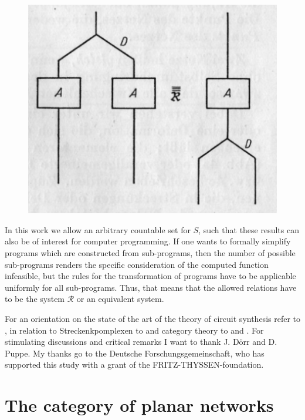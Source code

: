 \documentclass{article}
\begin{document}
\begin{figure}
\includegraphics[]{figure2.png}
  \centering
\caption{}
\label{fig:figure2}
\end{figure}

In this work we allow an arbitrary countable set for $S$, such that these results can also be of interest for computer programming. If one wants to formally simplify programs which are constructed from sub-programs, then the number of possible sub-programs renders the specific consideration of the computed function infeasible, but the rules for the transformation of programs have to be applicable uniformly for all sub-programs. Thus, that means that the allowed relations have to be the system
$\mathcal{R}$ or an equivalent system.

For an orientation on the state of the art of the theory of circuit synthesis refer to \cite{circuit-synthesis}, in relation to Streckenkpomplexen to \cite{combinatory-topology} and category theory to \cite{categories-functors} and \cite{category-theory}.
For stimulating discussions and critical remarks I want to thank J. D\"{o}rr and D. Puppe. My thanks go to the Deutsche Forschungsgemeinschaft, who has supported this study with a grant of the FRITZ-THYSSEN-foundation.

\section{The category of planar networks }
\end{document}
